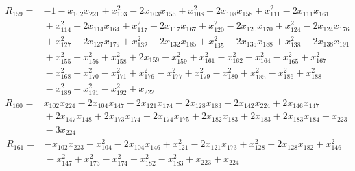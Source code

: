 \begin{align*}
R_{159}={}& -1 - x_{102}x_{221} + x_{103}^{2} - 2x_{103}x_{155} + x_{108}^{2} - 2x_{108}x_{158} + x_{111}^{2} - 2x_{111}x_{161} \\
&{} + x_{114}^{2} - 2x_{114}x_{164} + x_{117}^{2} - 2x_{117}x_{167} + x_{120}^{2} - 2x_{120}x_{170} + x_{124}^{2} - 2x_{124}x_{176} \\
&{} + x_{127}^{2} - 2x_{127}x_{179} + x_{132}^{2} - 2x_{132}x_{185} + x_{135}^{2} - 2x_{135}x_{188} + x_{138}^{2} - 2x_{138}x_{191} \\
&{} + x_{155}^{2} - x_{156}^{2} + x_{158}^{2} + 2x_{159} - x_{159}^{2} + x_{161}^{2} - x_{162}^{2} + x_{164}^{2} - x_{165}^{2} + x_{167}^{2} \\
&{} - x_{168}^{2} + x_{170}^{2} - x_{171}^{2} + x_{176}^{2} - x_{177}^{2} + x_{179}^{2} - x_{180}^{2} + x_{185}^{2} - x_{186}^{2} + x_{188}^{2} \\
&{} - x_{189}^{2} + x_{191}^{2} - x_{192}^{2} + x_{222}
\end{align*}
\begin{align*}
R_{160}={}& x_{102}x_{224} - 2x_{104}x_{147} - 2x_{121}x_{174} - 2x_{128}x_{183} - 2x_{142}x_{224} + 2x_{146}x_{147} \\
&{} + 2x_{147}x_{148} + 2x_{173}x_{174} + 2x_{174}x_{175} + 2x_{182}x_{183} + 2x_{183} + 2x_{183}x_{184} + x_{223} \\
&{} - 3x_{224}
\end{align*}
\begin{align*}
R_{161}={}& -x_{102}x_{223} + x_{104}^{2} - 2x_{104}x_{146} + x_{121}^{2} - 2x_{121}x_{173} + x_{128}^{2} - 2x_{128}x_{182} + x_{146}^{2} \\
&{} - x_{147}^{2} + x_{173}^{2} - x_{174}^{2} + x_{182}^{2} - x_{183}^{2} + x_{223} + x_{224}
\end{align*}
\endgroup
